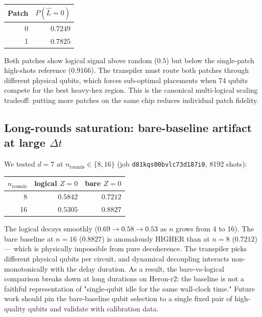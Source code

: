 \documentclass[11pt,letterpaper]{article}
\begin{document}
\begin{center}
\begin{tabular}{rr}
\toprule
Patch & $P(\hat L = 0)$ \\
\midrule
0 & $0.7249$ \\
1 & $0.7825$ \\
\bottomrule
\end{tabular}
\end{center}

Both patches show logical signal above random ($0.5$) but below the single-patch high-shots reference ($0.9166$). The transpiler must route both patches through different physical qubits, which forces sub-optimal placements when 74 qubits compete for the best heavy-hex region. This is the canonical multi-logical scaling tradeoff: putting more patches on the same chip reduces individual patch fidelity.

\subsection{Long-rounds saturation: bare-baseline artifact at large $\Delta t$}\label{ssec:long_rounds}

We tested $d = 7$ at $n_{\mathrm{rounds}} \in \{8, 16\}$ (job \texttt{d81kqs00bvlc73d187i0}, 8192 shots):

\begin{center}
\begin{tabular}{rrr}
\toprule
$n_{\mathrm{rounds}}$ & logical $Z = 0$ & bare $Z = 0$ \\
\midrule
8 & $0.5842$ & $0.7212$ \\
16 & $0.5305$ & $\bm{0.8827}$ \\
\bottomrule
\end{tabular}
\end{center}

The logical decays smoothly ($0.69 \to 0.58 \to 0.53$ as $n$ grows from 4 to 16). The bare baseline at $n = 16$ ($0.8827$) is anomalously HIGHER than at $n = 8$ ($0.7212$) --- which is physically impossible from pure decoherence. The transpiler picks different physical qubits per circuit, and dynamical decoupling interacts non-monotonically with the delay duration. As a result, the bare-vs-logical comparison breaks down at long durations on Heron-r2: the baseline is not a faithful representation of "single-qubit idle for the same wall-clock time." Future work should pin the bare-baseline qubit selection to a single fixed pair of high-quality qubits and validate with calibration data.
\end{document}
